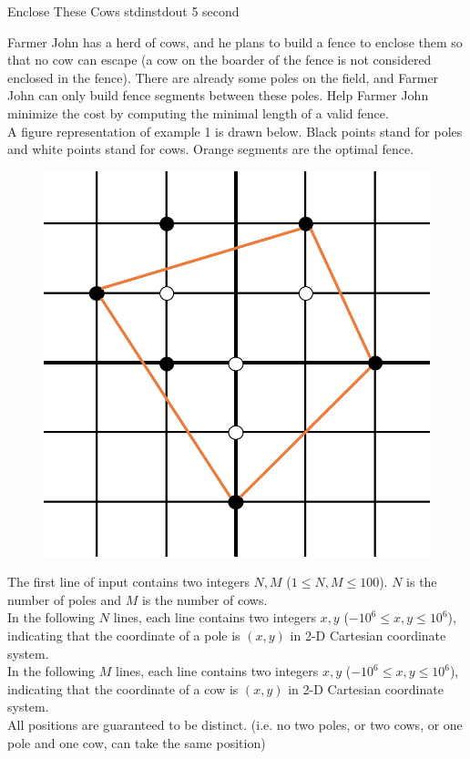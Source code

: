 \begin{problem}{Enclose These Cows}
{stdin}{stdout}
{5 second}{}{}

Farmer John has a herd of cows, and he plans to build a fence to enclose them so that no cow can escape (a cow on the boarder of the fence is not considered enclosed in the fence). There are already some poles on the field, and Farmer John can only build fence segments between these poles. Help Farmer John minimize the cost by computing the minimal length of a valid fence. \\
A figure representation of example 1 is drawn below. Black points stand for poles and white points stand for cows. Orange segments are the optimal fence. 
\begin{figure}[!h]
	\centering
	\includegraphics[scale=0.4]{misc/sample1.png}
\end{figure}

\InputFile

The first line of input contains two integers $N, M$ ($1 \le N, M \le 100$). $N$ is the number of poles and $M$ is the number of cows. \\
In the following $N$ lines, each line contains two integers $x, y$ ($-10^6 \le x, y \le 10^6$), indicating that the coordinate of a pole is $(x, y)$ in 2-D Cartesian coordinate system. \\
In the following $M$ lines, each line contains two integers $x, y$ ($-10^6 \le x, y \le 10^6$), indicating that the coordinate of a cow is $(x, y)$ in 2-D Cartesian coordinate system. \\
All positions are guaranteed to be distinct. (i.e. no two poles, or two cows, or one pole and one cow, can take the same position)


\end{problem}
